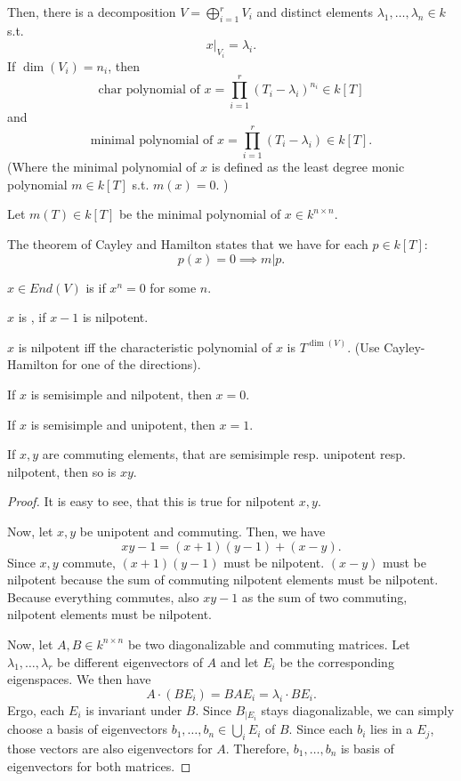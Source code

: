 Then, there is a decomposition $V = \bigoplus_{i=1}^r V_i$ and distinct elements $\lambda_1, \ldots, \lambda_n \in k$ s.t.
\[ x|_{V_i} = \lambda_i. \]
If $\dim(V_i)= n_i$, then
\[ \text{char polynomial of }x = \prod_{i=1}^r (T_i - \lambda_i)^{n_i} \in k[T] \]
and
\[ \text{minimal polynomial of }x = \prod_{i=1}^r (T_i - \lambda_i) \in k[T]. \]
(Where the minimal polynomial of $x$ is defined as the least degree monic polynomial $m \in k[T]$ s.t. $m(x) = 0$. )


\begin{remark}
	Let $m(T) \in k[T]$ be the minimal polynomial of $x \in k^{n\times n}$.
	
	The theorem of Cayley and Hamilton states that we have for each $p \in k[T]$:
	\[ p(x) = 0 \implies m | p. \]
\end{remark}

\begin{definition}
	$x \in End(V)$ is  if $x^n = 0$ for some $n$.

	$x$ is , if $x -1$ is nilpotent.
\end{definition}

\begin{lemma}
	$x$ is nilpotent iff the characteristic polynomial of $x$ is $T^{\dim(V)}$.
	(Use Cayley-Hamilton for one of the directions).
\end{lemma}

\begin{lemma}
	If $x$ is semisimple and nilpotent, then $x = 0$.
	
	If $x$ is semisimple and unipotent, then $x = 1$.
\end{lemma}
\begin{lemma}
	If $x,y$ are commuting elements, that are semisimple resp. unipotent resp. nilpotent, then so is $xy$.
\end{lemma}
\begin{proof}
	It is easy to see, that this is true for nilpotent $x,y$.
	
	Now, let $x,y$ be unipotent and commuting. Then, we have
	\[ xy - 1 = (x+1)(y-1) + (x-y). \]
	Since $x,y$ commute, $ (x+1)(y-1)$ must be nilpotent. $(x-y)$ must be nilpotent because the sum of commuting nilpotent elements must be nilpotent.
	Because everything commutes, also $xy-1$ as the sum of two commuting, nilpotent elements must be nilpotent.
	
	Now, let $A,B \in k^{n\times n}$ be two diagonalizable and commuting matrices. Let $\lambda_1,\ldots, \lambda_r$ be different eigenvectors of $A$ and let $E_i$ be the corresponding eigenspaces. We then have
	\[ A\cdot (B E_i) = BAE_i = \lambda_i \cdot BE_i. \]
	Ergo, each $E_i$ is invariant under $B$.
	Since $B_{|E_i}$ stays diagonalizable, we can simply choose a basis of eigenvectors $b_1,\ldots, b_n \in \bigcup_i E_i$ of $B$. Since each $b_i$ lies in a $E_j$, those vectors are also eigenvectors for $A$. Therefore, $b_1,\ldots,b_n$ is basis of eigenvectors for both matrices. 
\end{proof}

